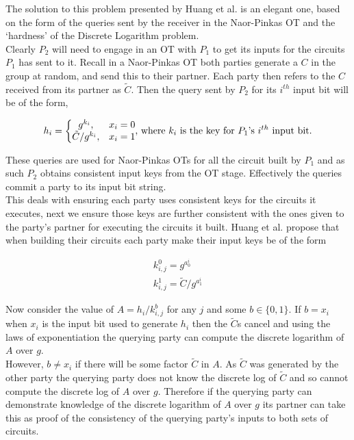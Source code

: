 \documentclass[ %
                    author={Nicholas Tutte},
                supervisor={Prof. Nigel Smart},
                    degree={MEng},
                     title={Secure Two Party Computation},
                  subtitle={A practical comparison of recent protocols},
                      type={Research - GG1K},
                      year={2015} ]{dissertation}
\begin{document}
				The solution to this problem presented by Huang et al. is an elegant one, based on the form of the queries sent by the receiver in the Naor-Pinkas OT and the `hardness' of the Discrete Logarithm problem.\\

				Clearly $P_2$ will need to engage in an OT with $P_1$ to get its inputs for the circuits $P_1$ has sent to it. Recall in a Naor-Pinkas OT both parties generate a $C$ in the group at random, and send this to their partner. Each party then refers to the $C$ received from its partner as $\tilde C$. Then the query sent by $P_2$ for its $i^{th}$ input bit will be of the form,

				$$
				h_i = \bigg\{
					\begin{matrix}
						g^{k_i}, & x_i = 0\\
						\tilde C / g^{k_i}, & x_i = 1
					\end{matrix}
					\textnormal{,  where } k_i \textnormal{ is the key for } P_1 \textnormal{'s } i^{th} \textnormal{ input bit.}
				$$

				These queries are used for Naor-Pinkas OTs for all the circuit built by $P_1$ and as such $P_2$ obtains consistent input keys from the OT stage. Effectively the queries commit a party to its input bit string.\\

				This deals with ensuring each party uses consistent keys for the circuits it executes, next we ensure those keys are further consistent with the ones given to the party's partner for executing the circuits it built. Huang et al. propose that when building their circuits each party make their input keys be of the form
				
				$$
				\begin{matrix}
					k_{i,j}^0 = g^{a_0^i}\\
					k_{i,j}^1 = \tilde C / g^{a_1^i}
				\end{matrix}
				$$

				Now consider the value of $A = h_i / k_{i,j}^{b}$ for any $j$ and some $b \in \{0, 1\}$. If $b = x_i$ when $x_i$ is the input bit used to generate $h_i$ then the $\tilde C$s cancel and using the laws of exponentiation the querying party can compute the discrete logarithm of $A$ over $g$.\\

				However, $b \neq x_i$ if there will be some factor $\tilde C$ in $A$. As $\tilde C$ was generated by the other party the querying party does not know the discrete log of $\tilde C$ and so cannot compute the discrete log of $A$ over $g$. Therefore if the querying party can demonstrate knowledge of the discrete logarithm of $A$ over $g$ its partner can take this as proof of the consistency of the querying party's inputs to both sets of circuits.
\end{document}
